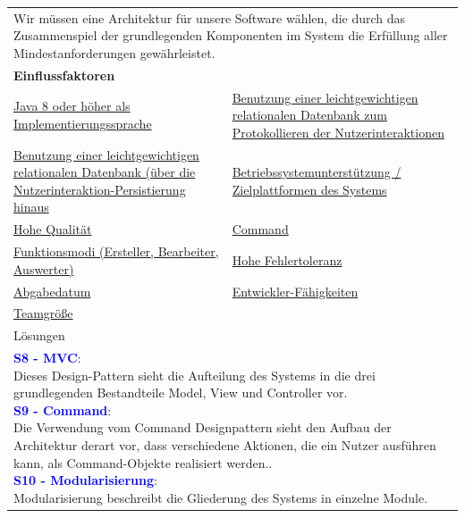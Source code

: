 \documentclass[enabledeprecatedfontcommands,fontsize=11pt,paper=a4,twoside]{scrartcl}
\newcounter{one}
\newcommand{\cb}[1]{{\textcolor{blue}{#1}}}
\begin{document}
\begin{tabular} {|p{8cm} p{8cm}|}
	\hline
	\rowcolor{prob}\multicolumn{2}{|l|}{\parbox{16cm}{\textbf{04: Auswahl der grundlegenden Softwarearchitektur}}} \\  \hline\hline 
	\multicolumn{2}{|l|}{\parbox{16cm}{Wir müssen eine Architektur für unsere Software wählen, die durch das Zusammenspiel der grundlegenden Komponenten im System die Erfüllung aller Mindestanforderungen gewährleistet.}}\rule{0pt}{1ex}\\ [1ex] \hline
	\multicolumn{2}{|l|}{\textbf{Einflussfaktoren}}\\
	\hyperlink{b}{Java 8 oder höher als Implementierungssprache}  &
	\hyperlink {d}{Benutzung einer leichtgewichtigen relationalen Datenbank zum Protokollieren der Nutzerinteraktionen}\\ 
	\hyperlink {e}{Benutzung einer leichtgewichtigen relationalen Datenbank (über die Nutzerinteraktion-Persistierung hinaus}&
	\hyperlink {f}{Betriebssystemunterstützung / Zielplattformen des Systems}\\
	\hyperlink {h}{Hohe Qualität}&
	\hyperlink {i}{Command} \\
	\hyperlink {z}{Funktionsmodi (Ersteller, Bearbeiter, Auswerter)}  &
	\hyperlink {tt}{Hohe Fehlertoleranz} \\
	\hyperlink {uu}{Abgabedatum} &
	\hyperlink {vv}{Entwickler-Fähigkeiten} \\
	\hyperlink {xx}{Teamgröße} &
	\\ \hline
	\multicolumn{2}{|l|}{Lösungen} \\
	\multicolumn{2}{|l|}{\parbox{16cm}{
			\textbf{\cb{\hypertarget{bbb}{S8 - MVC}}}: \\
			Dieses Design-Pattern sieht die Aufteilung des Systems in die drei grundlegenden Bestandteile Model, View und Controller vor. \\
			\textbf{\cb{S9 - Command}}: \\
			Die Verwendung vom Command Designpattern sieht den Aufbau der Architektur derart vor, dass verschiedene Aktionen, die ein Nutzer ausführen kann, als Command-Objekte realisiert werden.. \\
			\textbf{\cb{S10 - Modularisierung}}: \\
			Modularisierung beschreibt die Gliederung des Systems in einzelne Module.
	} }\\ [8ex] \hline
\end{tabular}\\ \\ \\
\end{document}
